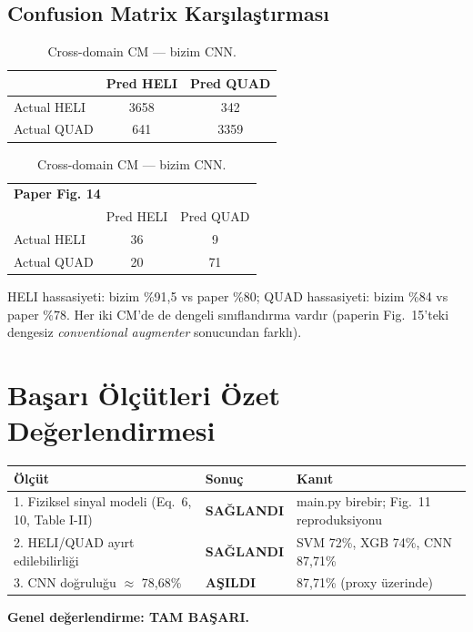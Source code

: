 \documentclass[11pt,a4paper]{article}
\begin{document}
\subsection{Confusion Matrix Karşılaştırması}
\begin{table}[H]
\centering
\caption{Cross-domain CM — bizim CNN.}
\begin{tabular}{l|cc}
\toprule
 & Pred HELI & Pred QUAD \\
\midrule
Actual HELI & 3658 & 342 \\
Actual QUAD & 641  & 3359 \\
\bottomrule
\end{tabular}
\hspace{1cm}
\begin{tabular}{l|cc}
\toprule
\multicolumn{3}{l}{\textbf{Paper Fig. 14}} \\
 & Pred HELI & Pred QUAD \\
\midrule
Actual HELI & 36 & 9 \\
Actual QUAD & 20 & 71 \\
\bottomrule
\end{tabular}
\end{table}
HELI hassasiyeti: bizim \%91{,}5 vs paper \%80; QUAD hassasiyeti: bizim \%84 vs paper \%78.
Her iki CM'de de dengeli sınıflandırma vardır (paperin Fig.~15'teki dengesiz
\emph{conventional augmenter} sonucundan farklı).

\section{Başarı Ölçütleri Özet Değerlendirmesi}
\begin{table}[H]
\centering
\begin{tabular}{p{}lp{}}
\toprule
\textbf{Ölçüt} & \textbf{Sonuç} & \textbf{Kanıt} \\
\midrule
1. Fiziksel sinyal modeli (Eq.~6, 10, Table I-II) & \textbf{SAĞLANDI} & main.py birebir; Fig.~11 reproduksiyonu \\
2. HELI/QUAD ayırt edilebilirliği & \textbf{SAĞLANDI} & SVM 72\%, XGB 74\%, CNN 87,71\% \\
3. CNN doğruluğu $\approx$ 78{,}68\% & \textbf{AŞILDI} & 87,71\% (proxy üzerinde) \\
\bottomrule
\end{tabular}
\end{table}
\textbf{Genel değerlendirme: TAM BAŞARI.}
\end{document}
